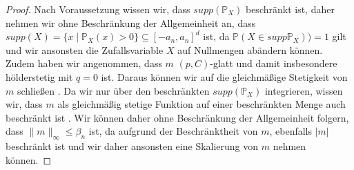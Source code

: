 \begin{proof}
Nach Voraussetzung wissen wir, dass $supp(\mathds{P}_X)$ beschränkt ist, daher nehmen wir ohne Beschränkung der Allgemeinheit an, dass $supp(X) = \{x \mid \mathds{P}_X(x) > 0\} \subseteq [-a_n, a_n]^d$ ist, da $\mathds{P}(X \in supp\mathds{P}_X)) = 1$ gilt und wir ansonsten die Zufallsvariable $X$ auf Nullmengen abändern können. Zudem haben wir angenommen, dass $m$ $(p,C)$-glatt und damit insbesondere hölderstetig mit $q = 0$ ist. Daraus können wir auf die gleichmäßige Stetigkeit von $m$ schließen \cite{Storch2018}. Da wir nur über den beschränkten $supp(\mathds{P}_X)$ integrieren, wissen wir, dass $m$ als gleichmäßig stetige Funktion auf einer beschränkten Menge auch beschränkt ist \cite{Storch2018}. Wir können daher ohne Beschränkung der Allgemeinheit folgern, dass $\|m\|_{\infty} \leq \beta_n$ ist, da aufgrund der Beschränktheit von $m$, ebenfalls $|m|$ beschränkt ist und wir daher ansonsten eine Skalierung von $m$ nehmen können.


\end{proof}
